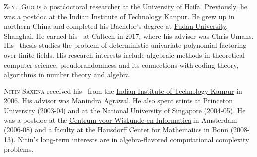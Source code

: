 \documentclass{toc}
\begin{document}
%
%
%
%
%
%
%
%
%
%
%
%
%
%
\begin{tocaboutauthors}
%
\begin{tocabout}[guo]    %
\textsc{Zeyu Guo} 
%
%
%
is a postdoctoral researcher at the University of Haifa. Previously, he was a postdoc at the Indian Institute of Technology Kanpur. %
He grew up in northern China and completed his Bachelor's degree at \href{http://www.fudan.edu.cn/en/}{Fudan University, Shanghai}. He earned his \phd\ at \href{http://www.caltech.edu/}{Caltech} in 2017, where his advisor was \href{http://users.cms.caltech.edu/~umans/}{Chris Umans}. His \phd\ thesis studies the problem of deterministic univariate polynomial factoring over finite fields. His research interests include algebraic methods in theoretical computer science, pseudorandomness and its connections with coding theory, algorithms in number theory and algebra. 
\end{tocabout}
\begin{tocabout}[saxena]
  \textsc{Nitin Saxena} received his \phd\ from the \href{http://www.iitk.ac.in}{Indian Institute of Technology Kanpur} in 2006.
%
%
%
%
%
%
%
%
%
His advisor was \href{https://sites.google.com/view/manindra/home}{Manindra Agrawal}.
He also spent stints at \href{https://www.princeton.edu/main/}{Princeton University} (2003-04) and at the \href{http://www.nus.edu.sg/}{National University of Singapore} (2004-05). He was a postdoc
%
at the  %
\href{https://www.cwi.nl/}{Centrum voor Wiskunde en
Informatica} in Amsterdam  %
(2006-08) and a faculty
%
at the  %
\href{http://www.hausdorff-center.uni-bonn.de/}{Hausdorff Center for 
%
Mathematics} in Bonn  %
(2008-13). Nitin's long-term interests are in
%
algebra-flavored  %
computational complexity problems.
%
%


\end{tocabout}
\end{tocaboutauthors}
\end{document}

